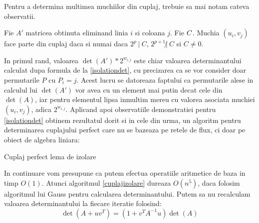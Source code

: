 \pagebreak

Pentru a determina multimea muchiilor din cuplaj, trebuie sa mai notam cateva observatii.

\begin{lem}
  Fie $A'$ matricea obtinuta eliminand linia $i$ si coloana $j$. Fie
  $C \def \det(A') * \frac{2^{w_{i,j}}}$. Muchia
  $(u_{i}, v_{j})$ face parte din cuplaj daca si numai daca $2^{p} \ | \ C$,
  $2^{p+1} \not| \ C$ si $C \neq 0$.
\end{lem}

In primul rand, valoarea $\det(A') * 2^{w_{i,j}}$ este chiar valoarea
determinantului calculat dupa formula de la \ref{isolationdet}, cu precizarea ca
se vor consider doar permutarile $P$ cu $P_{i} = j$. Acest lucru se datoreaza
faptului ca permutarile alese in calculul lui $\det(A')$ vor avea cu un element
mai putin decat cele din $\det(A)$, iar pentru elementul lipsa inmultim mereu cu
valorea asociata muchiei $(u_{i}, v_{j})$, adica $2^{w_{i,j}}$.
Aplicand apoi observatiile demonstratiei pentru \ref{isolationdet} obtinem
rezultatul dorit si in cele din urma, un algoritm pentru determinarea cuplajului
perfect care nu se bazeaza pe retele de flux, ci doar pe obiect de algebra
liniara: \par

\vspace{5 mm}

\begin{algorithm}[H]
 \label{cuplajizolare}
 \caption{Cuplaj perfect lema de izolare}
\end{algorithm}

\pagebreak

In continuare vom presupune ca putem efectua operatiile aritmetice de baza in timp $O(1)$.
Atunci algoritmul \ref{cuplajizolare} dureaza $O(n^{5})$, daca folosim
algoritmul lui Gauss pentru calcularea determinantului. Putem sa nu recalculam
valoarea determinantului la fiecare iteratie folosind:
\begin{equation}
  \det(A + uv^{T}) = (1 + v^{T} A^{-1} u) \det(A)
\end{equation}

